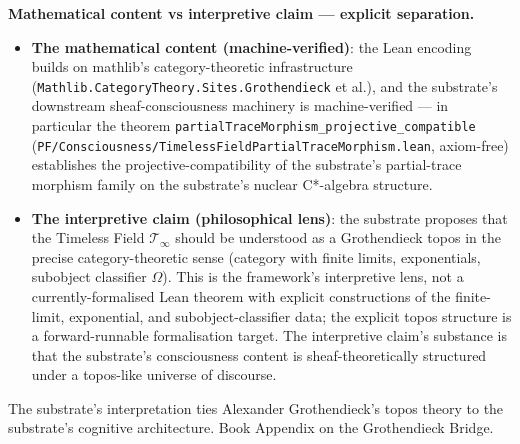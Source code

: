 \documentclass[11pt,a4paper]{amsart}
\theoremstyle{plain}
\theoremstyle{definition}
\begin{document}
\textbf{Mathematical content vs interpretive claim --- explicit separation.}
\begin{itemize}[itemsep=2pt,leftmargin=2em]
\item \textbf{The mathematical content (machine-verified)}: the Lean encoding builds on mathlib's category-theoretic infrastructure (\texttt{Mathlib.\allowbreak CategoryTheory.\allowbreak Sites.\allowbreak Grothendieck} et al.), and the substrate's downstream sheaf-consciousness machinery is machine-verified --- in particular the theorem \texttt{partialTraceMorphism\_\allowbreak projective\_compatible} (\texttt{PF/\allowbreak Consciousness/\allowbreak TimelessField\allowbreak PartialTraceMorphism.lean}, axiom-free) establishes the projective-compatibility of the substrate's partial-trace morphism family on the substrate's nuclear C*-algebra structure.
\item \textbf{The interpretive claim (philosophical lens)}: the substrate proposes that the Timeless Field $\mathcal{T}_\infty$ should be understood as a Grothendieck topos in the precise category-theoretic sense (category with finite limits, exponentials, subobject classifier $\Omega$). This is the framework's interpretive lens, not a currently-formalised Lean theorem with explicit constructions of the finite-limit, exponential, and subobject-classifier data; the explicit topos structure is a forward-runnable formalisation target. The interpretive claim's substance is that the substrate's consciousness content is sheaf-theoretically structured under a topos-like universe of discourse.
\end{itemize}
The substrate's interpretation ties Alexander Grothendieck's topos theory to the substrate's cognitive architecture. Book Appendix on the Grothendieck Bridge.
\end{document}
